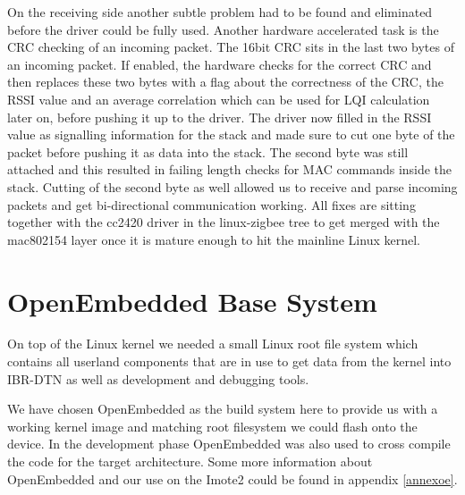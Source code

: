 On the receiving side another subtle problem had to be found and eliminated
before the driver could be fully used. Another hardware accelerated task is the
CRC checking of an incoming packet. The 16bit CRC sits in the last two bytes of
an incoming packet. If enabled, the hardware checks for the correct CRC and
then replaces these two bytes with a flag about the correctness of the CRC, the
RSSI value and an average correlation which can be used for LQI calculation
later on, before pushing it up to the driver. The driver now filled in the RSSI
value as signalling information for the stack and made sure to cut one byte
of the packet before pushing it as data into the stack. The second byte was
still attached and this resulted in failing length checks for MAC commands
inside the stack. Cutting of the second byte as well allowed us to receive
and parse incoming packets and get bi-directional communication working. All
fixes are sitting together with the cc2420 driver in the linux-zigbee tree to
get merged with the mac802154 layer once it is mature enough to hit the
mainline Linux kernel.

\section{OpenEmbedded Base System}
On top of the Linux kernel we needed a small Linux root file system which
contains all userland components that are in use to get data from the kernel
into IBR-DTN as well as development and debugging tools.

We have chosen OpenEmbedded as the build system here to provide us with a working
kernel image and matching root filesystem we could flash onto the device. In the
development phase OpenEmbedded was also used to cross compile the code for the
target architecture. Some more information about OpenEmbedded and our use on the
Imote2 could be found in appendix \ref{annexoe}.
